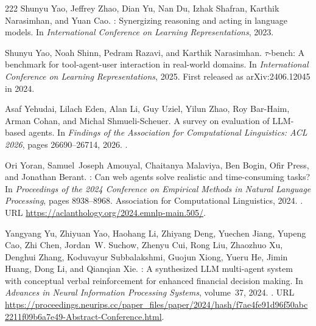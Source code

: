 \begin{thebibliography}{222}
Shunyu Yao, Jeffrey Zhao, Dian Yu, Nan Du, Izhak Shafran, Karthik Narasimhan,
  and Yuan Cao.
: Synergizing reasoning and acting in language models.
\newblock In \emph{International Conference on Learning Representations},
  2023{}.

Shunyu Yao, Noah Shinn, Pedram Razavi, and Karthik Narasimhan.
\newblock $\tau$-bench: A benchmark for tool-agent-user interaction in
  real-world domains.
\newblock In \emph{International Conference on Learning Representations}, 2025.
\newblock First released as arXiv:2406.12045 in 2024.

Asaf Yehudai, Lilach Eden, Alan Li, Guy Uziel, Yilun Zhao, Roy Bar-Haim, Arman
  Cohan, and Michal Shmueli-Scheuer.
\newblock A survey on evaluation of {LLM}-based agents.
\newblock In \emph{Findings of the Association for Computational Linguistics:
  ACL 2026}, pages 26690--26714, 2026.
\newblock {}.

Ori Yoran, Samuel~Joseph Amouyal, Chaitanya Malaviya, Ben Bogin, Ofir Press,
  and Jonathan Berant.
: Can web agents solve realistic and time-consuming
  tasks?
\newblock In \emph{Proceedings of the 2024 Conference on Empirical Methods in
  Natural Language Processing}, pages 8938--8968. Association for Computational
  Linguistics, 2024.
\newblock {}.
\newblock URL \url{https://aclanthology.org/2024.emnlp-main.505/}.

Yangyang Yu, Zhiyuan Yao, Haohang Li, Zhiyang Deng, Yuechen Jiang, Yupeng Cao,
  Zhi Chen, Jordan~W. Suchow, Zhenyu Cui, Rong Liu, Zhaozhuo Xu, Denghui Zhang,
  Koduvayur Subbalakshmi, Guojun Xiong, Yueru He, Jimin Huang, Dong Li, and
  Qianqian Xie.
: A synthesized {LLM} multi-agent system with conceptual
  verbal reinforcement for enhanced financial decision making.
\newblock In \emph{Advances in Neural Information Processing Systems},
  volume~37, 2024.
\newblock {}.
\newblock URL
  \url{https://proceedings.neurips.cc/paper_files/paper/2024/hash/f7ae4fe91d96f50abc2211f09b6a7e49-Abstract-Conference.html}.


\end{thebibliography}
